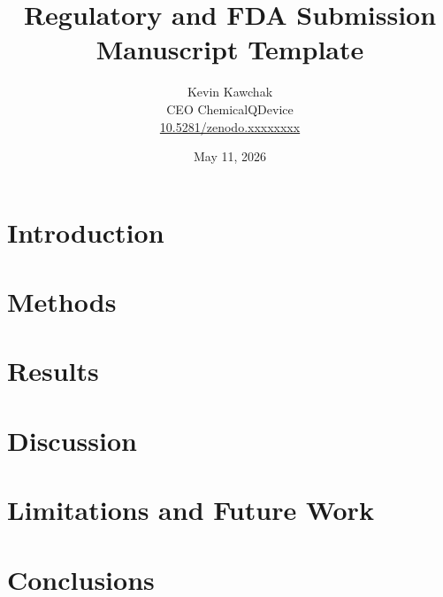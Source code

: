 \documentclass[11pt]{article}
\title{Regulatory and FDA Submission Manuscript Template}
\author{
  Kevin Kawchak\hspace{2pt}\orcidicon{0009-0007-5457-8667} \\
  CEO ChemicalQDevice\\
  \href{https://doi.org/10.5281/zenodo.xxxxxxxx}{10.5281/zenodo.xxxxxxxx} \\
}
\date{May 11, 2026}
\begin{document}
\maketitle

\begin{abstract}

\end{abstract}

\keywords{ }

\vspace{-0.2cm}

\section{Introduction}
\label{sec:introduction}


\tableofcontents
\vspace{0.4cm}

\newpage
\section{Methods}
\label{sec:methods}

\newpage

\section{Results}
\label{sec:results}

\newpage

\section{Discussion}
\label{sec:discussion}


\section{Limitations and Future Work}
\label{sec:limitations}

\newpage

\section{Conclusions}
\label{sec:conclusions}

\newpage

{}
\begingroup
\raggedright


\endgroup
\newpage


\end{document}
